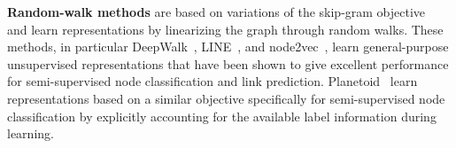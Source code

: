 \documentclass{article}
\begin{document}
\textbf{Random-walk methods} are based on variations of the skip-gram objective~\citep{mikolov2013distributed} and learn representations by linearizing the graph through random walks. These methods, in particular DeepWalk~\citep{perozzi2014deepwalk}, LINE~\citep{tang2015line}, and node2vec~\citep{grover2016node2vec}, learn general-purpose unsupervised representations that have been shown to give excellent performance for  semi-supervised node classification and link prediction. Planetoid~\citep{yang2016embeddings} learn representations based on a similar objective specifically for semi-supervised node classification by explicitly accounting for the available label information during learning.
 
\end{document}
